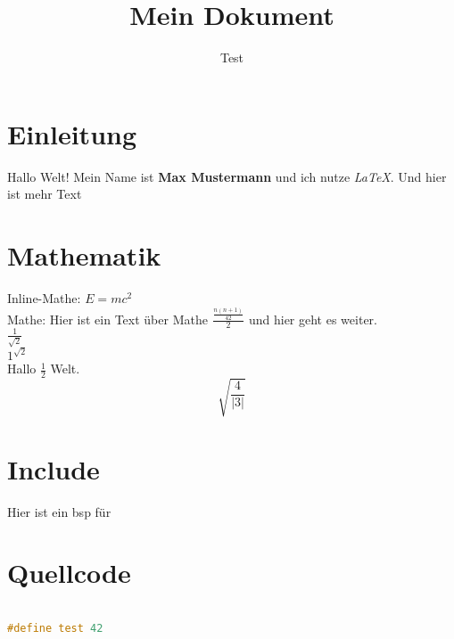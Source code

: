 \documentclass{article}
\title{Mein Dokument}
\author{Test}
\begin{document}
\maketitle

\section{Einleitung}
Hallo Welt! 
Mein Name ist \textbf{Max Mustermann} und ich nutze \textit{LaTeX}.
Und hier ist mehr Text

\section{Mathematik}
Inline-Mathe: $E = mc^2$  \\
Mathe: Hier ist ein Text über Mathe \(\frac{\frac{n(n+1)}{ 42}}{ 2}\) und hier geht es weiter.\\  

\(\frac{1}{ \sqrt{2}}\) \\

\({1}^{ \sqrt{2}}\) \\

Hallo \(\frac{1}{ 2}\) Welt.  
\[\sqrt{\frac{4}{ \left|3\right|}}\]

\section{Include}
Hier ist ein bsp für 

\section{Quellcode}

\begin{lstlisting}[language=c++]

#define test 42

\end{lstlisting}
\end{document}
